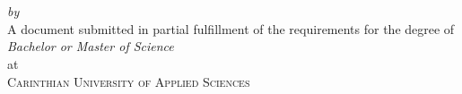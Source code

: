 
\begin{titlepage}
  \vspace*{5cm}
  \makeatletter
  \begin{center}
    \begin{Huge}
      \@title
    \end{Huge}\\[0.1cm]
    \begin{Large}
      \@subtitle
    \end{Large}\\
    \emph{by}\\
    \@author
    \vfill
    A document submitted in partial fulfillment
    of the requirements for the degree of\\
    \emph{Bachelor or Master of Science}\\
    at\\
    \textsc{Carinthian University of Applied Sciences}
  \end{center}
  \makeatother
\end{titlepage}

\newpage
\null
\thispagestyle{empty}
\newpage
